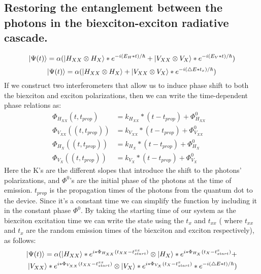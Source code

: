 \subsection{Restoring the entanglement between the photons in the biexciton-exciton radiative cascade.}
	\begin{equation}
	\ket{\Psi(t)} = \alpha(\ket{H_{XX} \otimes  H_X}*e^{-i(E_H*t)/\hbar}+\ket{V_{XX}\otimes V_X}*e^{-i(E_V*t)/\hbar})
\end{equation}
\begin{equation}
	\ket{\Psi(t)} = \alpha(\ket{H_{XX} \otimes H_X}+\ket{V_{XX}\otimes V_X}*e^{-i(\triangle E*t_x)/\hbar})
\end{equation}
If we construct two interferometers that allow us to induce phase shift to both the biexciton and exciton polarizations, then we can write the time-dependent phase relations as: 
\begin{equation}
\begin{aligned} 
		\Phi_{H_{XX}}{(t,t_{prop})} &= k_{H_{XX}}*(t-t_{prop}) + \Phi^0_{H_{XX}} & \\	\Phi_{V_{XX}}{((t,t_{prop}))} &= k_{V_{XX}}*(t-t_{prop}) + \Phi^0_{V_{XX}} \\
        \Phi_{H_{X}}{((t,t_{prop}))} &= k_{H_{X}}*(t-t_{prop}) + \Phi^0_{H_{X}} &\\
		  \Phi_{V_{X}}{((t,t_{prop}))} &= k_{V_{X}}*(t-t_{prop}) + \Phi^0_{V_{X}} 
\end{aligned}
\end{equation}
Here the  K's are the different slopes that introduce the shift to the photons' polarizations, and  $\Phi^0$'s are the initial phase of the photons at the time of emission. $t_{prop}$ is the propagation times of the photons from the quantum dot to the device. Since it's a constant time we can simplify the function by including it in the constant phase $\Phi^0$.
By taking the starting time of our system as the biexciton excitation time we can write the state using the $t_x$ and $t_{xx}$ ( where $t_{xx}$ and $t_{x}$ are the random emission times of the biexciton and exciton respectively), as follows:
\begin{equation}
\begin{split}
		\ket{\Psi(t)}= \alpha(\ket{H_{XX}}*e^{i*\Phi_{H_{XX}}(t_{XX}-t^{xx}_{start})} \otimes 
		\ket{H_{X}}*e^{i*\Phi_{H_{X}}(t_{X}-t^{x}_{start})}+\\
        \ket{V_{XX}}*e^{i*\Phi_{V_{XX}}(t_{XX}-t^{xx}_{start})} \otimes 
		\ket{V_{X}}*e^{i*\Phi_{V_{X}}(t_{X}-t^{x}_{start})}*e^{-i(\triangle E*t)/\hbar})	
  \end{split}
\end{equation} 
